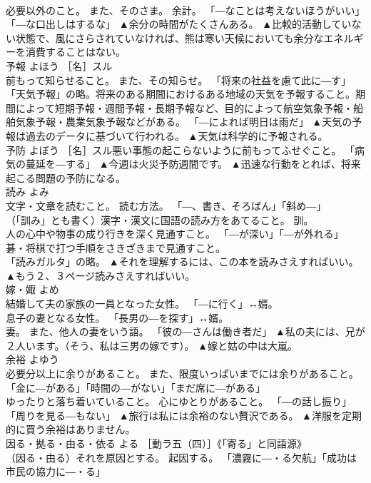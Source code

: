 \documentclass[8pt]{extreport}
\begin{document}
\begin{CJK}{UTF8}{min}
\\	必要以外のこと。 また、そのさま。 余計。 「―なことは考えないほうがいい」「―な口出しはするな」	▲余分の時間がたくさんある。 ▲比較的活動していない状態で、風にさらされていなければ、熊は寒い天候においても余分なエネルギーを消費することはない。
\\	予報	よほう	［名］スル 
\\	前もって知らせること。 また、その知らせ。 「将来の社益を慮て此に―す」 
\\	「天気予報」の略。将来のある期間におけるある地域の天気を予報すること。期間によって短期予報・週間予報・長期予報など、目的によって航空気象予報・船舶気象予報・農業気象予報などがある。 「―によれば明日は雨だ」	▲天気の予報は過去のデータに基づいて行われる。 ▲天気は科学的に予報される。
\\	予防	よぼう	［名］スル悪い事態の起こらないように前もってふせぐこと。 「病気の蔓延を―する」	▲今週は火災予防週間です。 ▲迅速な行動をとれば、将来起こる問題の予防になる。
\\	読み	よみ	
\\	文字・文章を読むこと。 読む方法。 「―、書き、そろばん」「斜め―」 
\\	（「訓み」とも書く）漢字・漢文に国語の読み方をあてること。 訓。 
\\	人の心中や物事の成り行きを深く見通すこと。 「―が深い」「―が外れる」 
\\	碁・将棋で打つ手順をさきざきまで見通すこと。 
\\	「読みガルタ」の略。	▲それを理解するには、この本を読みさえすればいい。 ▲もう２、３ページ読みさえすればいい。
\\	嫁・娵	よめ	
\\	結婚して夫の家族の一員となった女性。 「―に行く」↔婿。 
\\	息子の妻となる女性。 「長男の―を探す」↔婿。 
\\	妻。 また、他人の妻をいう語。 「彼の―さんは働き者だ」	▲私の夫には、兄が２人います。（そう、私は三男の嫁です）。 ▲嫁と姑の中は大嵐。
\\	余裕	よゆう	
\\	必要分以上に余りがあること。 また、限度いっぱいまでには余りがあること。 「金に―がある」「時間の―がない」「まだ席に―がある」 
\\	ゆったりと落ち着いていること。 心にゆとりがあること。 「―の話し振り」「周りを見る―もない」	▲旅行は私には余裕のない贅沢である。 ▲洋服を定期的に買う余裕はありません。
\\	因る・拠る・由る・依る	よる	［動ラ五（四）］《「寄る」と同語源》 
\\	（因る・由る）それを原因とする。 起因する。 「濃霧に―・る欠航」「成功は市民の協力に―・る」 

\end{CJK}
\end{document}
